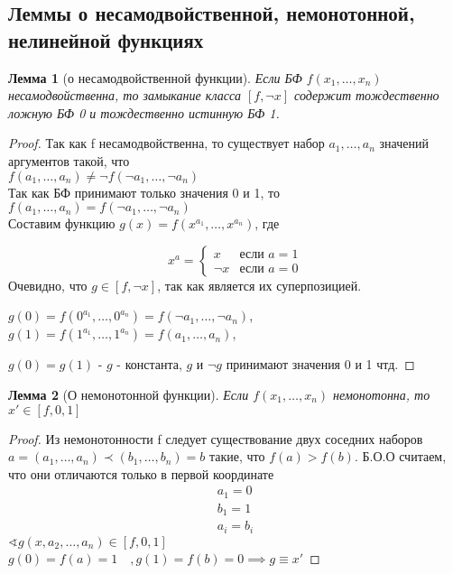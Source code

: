 \documentclass[a4paper]{article}
\newtheorem{lemma}{Лемма}[section]
\theoremstyle{definition}
\theoremstyle{remark}
\begin{document}
    \subsection{Леммы о несамодвойственной, немонотонной, нелинейной функциях}
    \begin{lemma}[о несамодвойственной функции]
        Если БФ $f(x_1, \dots, x_n)$ несамодвойственна, то замыкание класса $[f, \neg x]$
        содержит тождественно ложную БФ 0 и тождественно истинную БФ 1.
    \end{lemma}
    \begin{proof}
        Так как f несамодвойственна, то существует набор $a_1, \dots, a_n$
        значений аргументов такой, что \\ $f(a_1, \dots, a_n) \neq \neg f(\neg a_1, \dots, \neg a_n)$ \\
        Так как БФ принимают только значения 0 и 1, то $f(a_1, \dots, a_n) = f(\neg a_1, \dots, \neg a_n)$ \\
        Составим функцию $g(x) = f(x^{a_1}, \dots, x^{a_n})$, где 
        
        \begin{equation*}
            x^a = 
            \begin{cases}
                x & \text{если $a = 1$}  \\ 
                \text{$\neg x$} & \text{если $a = 0$} 
            \end{cases}
        \end{equation*}
        Очевидно, что $g \in [f, \neg x]$, так как является их суперпозицией.

        $g(0) = f(0^{a_1}, \dots, 0^{a_n}) = f(\neg a_1, \dots, \neg a_n)$, 
        $g(1) = f(1^{a_1}, \dots, 1^{a_n}) = f(a_1, \dots, a_n)$, 

        $g(0) = g(1)$ - $g$ - константа, $g$ и $\neg g$ принимают значения 0 и 1 чтд.
    \end{proof}
    \begin{lemma}[О немонотонной функции]
        Если $f(x_1, \dots, x_n)$ немонотонна, то $x' \in [f, 0, 1]$
    \end{lemma}
    \begin{proof}
        Из немонотонности f следует существование двух соседних наборов 
        $a = (a_1, \dots, a_n) \prec (b_1, \dots, b_n) = b$
        такие, что $f(a) > f(b)$. Б.О.О считаем, что они отличаются только в первой
        координате
        \begin{align*}
            a_1 = 0 \\
            b_1 = 1 \\
            a_i = b_i
        \end{align*}
        $\sphericalangle g(x, a_2, \dots, a_n) \in [f, 0, 1]$\\
        $g(0) = f(a) = 1\quad, g(1) = f(b) = 0 \implies g \equiv x'$
    \end{proof}
\end{document}
